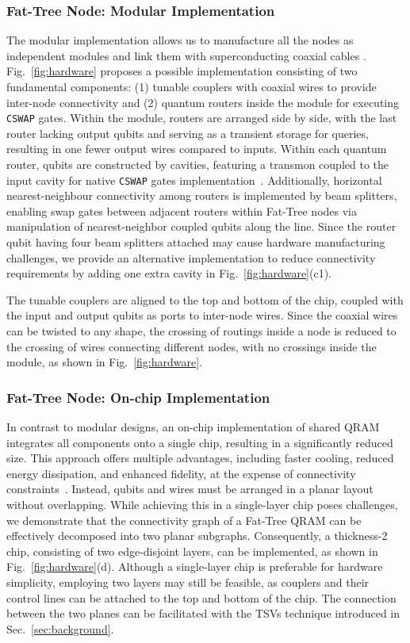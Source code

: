 \subsubsection{Fat-Tree Node: Modular Implementation}
\label{subsubsec:modular}
The modular implementation allows us to manufacture all the nodes as independent modules and link them with superconducting coaxial cables \cite{zhong2021deterministic}. Fig.~\ref{fig:hardware} proposes a possible implementation consisting of two fundamental components: (1) tunable couplers with coaxial wires to provide inter-node connectivity and (2) quantum routers inside the module for executing \texttt{CSWAP} gates. Within the module, routers are arranged side by side, with the last router lacking output qubits and serving as a transient storage for queries, resulting in one fewer output wires compared to inputs. Within each quantum router, qubits are constructed by cavities, featuring a transmon coupled to the input cavity for native \texttt{CSWAP} gates implementation~\cite{weiss2024quantum,chapman2023high}. Additionally, horizontal nearest-neighbour connectivity among routers is implemented by beam splitters, enabling swap gates between adjacent routers within Fat-Tree nodes via manipulation of nearest-neighbor coupled qubits along the line. Since the router qubit having four beam splitters attached may cause hardware manufacturing challenges, we provide an alternative implementation to reduce connectivity requirements by adding one extra cavity in Fig.~\ref{fig:hardware}(c1).

The tunable couplers are aligned to the top and bottom of the chip, coupled with the input and output qubits as ports to inter-node wires. Since the coaxial wires can be twisted to any shape, the crossing of routings inside a node is reduced to the crossing of wires connecting different nodes, with no crossings inside the module, as shown in Fig.~\ref{fig:hardware}.

\subsubsection{Fat-Tree Node: On-chip Implementation}
\label{subsubsec:onchip}
In contrast to modular designs, an on-chip implementation of shared QRAM integrates all components onto a single chip, resulting in a significantly reduced size. This approach offers multiple advantages, including faster cooling, reduced energy dissipation, and enhanced fidelity, at the expense of connectivity constraints~\cite{ganjam2024surpassing}. Instead, qubits and wires must be arranged in a planar layout without overlapping. While achieving this in a single-layer chip poses challenges, we demonstrate that the connectivity graph of a Fat-Tree QRAM can be effectively decomposed into two planar subgraphs. Consequently, a thickness-2 chip, consisting of two edge-disjoint layers, can be implemented, as shown in Fig.~\ref{fig:hardware}(d). Although a single-layer chip is preferable for hardware simplicity, employing two layers may still be feasible, as couplers and their control lines can be attached to the top and bottom of the chip. The connection between the two planes can be facilitated with the TSVs technique introduced in Sec.~\ref{sec:background}.

